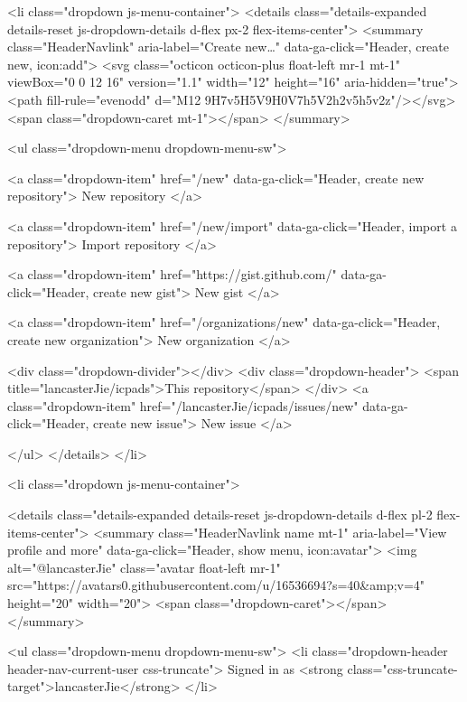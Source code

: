   <li class="dropdown js-menu-container">
    <details class="details-expanded details-reset js-dropdown-details d-flex px-2 flex-items-center">
      <summary class="HeaderNavlink"
         aria-label="Create new…"
         data-ga-click="Header, create new, icon:add">
        <svg class="octicon octicon-plus float-left mr-1 mt-1" viewBox="0 0 12 16" version="1.1" width="12" height="16" aria-hidden="true"><path fill-rule="evenodd" d="M12 9H7v5H5V9H0V7h5V2h2v5h5v2z"/></svg>
        <span class="dropdown-caret mt-1"></span>
      </summary>

      <ul class="dropdown-menu dropdown-menu-sw">
        
<a class="dropdown-item" href="/new" data-ga-click="Header, create new repository">
  New repository
</a>

  <a class="dropdown-item" href="/new/import" data-ga-click="Header, import a repository">
    Import repository
  </a>

<a class="dropdown-item" href="https://gist.github.com/" data-ga-click="Header, create new gist">
  New gist
</a>

  <a class="dropdown-item" href="/organizations/new" data-ga-click="Header, create new organization">
    New organization
  </a>



  <div class="dropdown-divider"></div>
  <div class="dropdown-header">
    <span title="lancasterJie/icpads">This repository</span>
  </div>
    <a class="dropdown-item" href="/lancasterJie/icpads/issues/new" data-ga-click="Header, create new issue">
      New issue
    </a>

      </ul>
    </details>
  </li>

  <li class="dropdown js-menu-container">

    <details class="details-expanded details-reset js-dropdown-details d-flex pl-2 flex-items-center">
      <summary class="HeaderNavlink name mt-1"
        aria-label="View profile and more"
        data-ga-click="Header, show menu, icon:avatar">
        <img alt="@lancasterJie" class="avatar float-left mr-1" src="https://avatars0.githubusercontent.com/u/16536694?s=40&amp;v=4" height="20" width="20">
        <span class="dropdown-caret"></span>
      </summary>

      <ul class="dropdown-menu dropdown-menu-sw">
        <li class="dropdown-header header-nav-current-user css-truncate">
          Signed in as <strong class="css-truncate-target">lancasterJie</strong>
        </li>

